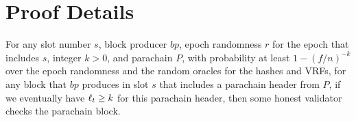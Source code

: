 \section{Proof Details}

\newcommand\valord{\ensuremath{\mathcal{O}}}

\begin{lemma}\label{lem:permutation}
For any slot number $s$, block producer $bp$, epoch randomness $r$ for the epoch that includes $s$, integer $k >0$, and parachain $P$, with probability at least $1-(f/n)^{-k}$ over the epoch randomness and the random oracles for the hashes and VRFs, for any block that $bp$ produces in slot $s$ that includes a parachain header from $P$, if we eventually have $\ell_t \geq k$ for this parachain header, then some honest validator checks the parachain block.
\end{lemma}
